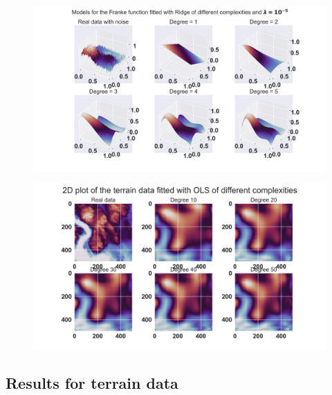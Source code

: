 \begin{figure}[h]
	\centering
	\includegraphics[width=\textwidth]{Figure_6.png}
	\caption{}
	\label{Ridge figure}
\end{figure}

\begin{figure}[h]
	\centering
	\includegraphics[width=\textwidth]{Figure_5.png}
	\caption{}
	\label{OLS figure terrain data}
\end{figure}
\subsection{Results for terrain data}
